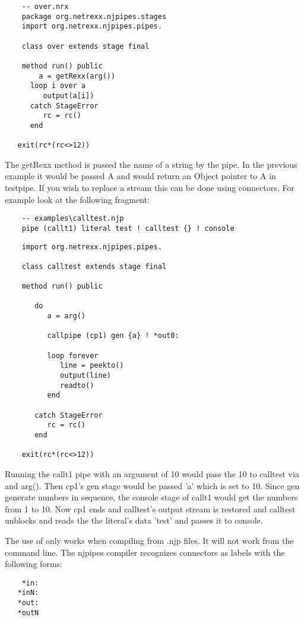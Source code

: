\begin{lstlisting}
    -- over.nrx
    package org.netrexx.njpipes.stages
    import org.netrexx.njpipes.pipes.

    class over extends stage final

    method run() public
        a = getRexx(arg())
      loop i over a
         output(a[i])
      catch StageError
         rc = rc()
      end
    
   exit(rc*(rc<>12))
\end{lstlisting}
 The getRexx method is passed the name of a string by the pipe.  In the previous example it would be passed A and would return an Object pointer to A in testpipe. If you wish to replace a stream this can be done using connectors.  For example look at the following fragment:
\begin{verbatim}
    -- examples\calltest.njp
    pipe (callt1) literal test ! calltest {} ! console
\end{verbatim}
\begin{lstlisting}
    import org.netrexx.njpipes.pipes.

    class calltest extends stage final

    method run() public

       do
          a = arg()

          callpipe (cp1) gen {a} ! *out0:

          loop forever
             line = peekto()
             output(line)
             readto()
          end

       catch StageError
          rc = rc()
       end

    exit(rc*(rc<>12))
\end{lstlisting}
Running the callt1 pipe with an argument of 10 would pass the 10 to calltest via {} and arg().  Then cp1's gen stage would be passed 'a' which is set to 10.  Since gen generate numbers in sequence, the console stage of callt1 would get the numbers from 1 to 10.  Now cp1 ends and calltest's output stream is restored and calltest unblocks and reads the the literal's data 'test' and passes it to console.

The use of {} only works when compiling from .njp files.  It will not work from the command line.
The njpipes compiler recognizes connectors as labels with the following forms:
\begin{verbatim}
    *in:
   *inN:
   *out:
   *outN
\end{verbatim}

